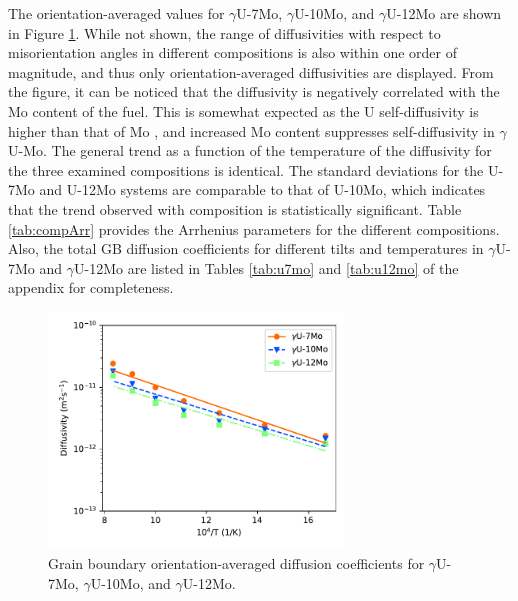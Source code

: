 \documentclass{elsarticle}
\begin{document}
The orientation-averaged values for $\gamma$U-7Mo, $\gamma$U-10Mo, and $\gamma$U-12Mo are shown in Figure \ref{fig:comp}. While not shown, the range of diffusivities with respect to misorientation angles in different compositions is also within one order of magnitude, and thus only orientation-averaged diffusivities are displayed. From the figure, it can be noticed that the diffusivity is negatively correlated with the Mo content of the fuel. This is somewhat expected as the U self-diffusivity is higher than that of Mo \cite{huang2013}, and increased Mo content suppresses self-diffusivity in $\gamma$U-Mo. The general trend as a function of the temperature of the diffusivity for the three examined compositions is identical. The standard deviations for the U-7Mo and U-12Mo systems are comparable to that of U-10Mo, which indicates that the trend observed with composition is statistically significant. Table \ref{tab:compArr} provides the Arrhenius parameters for the different compositions. Also, the total GB diffusion coefficients for different tilts and temperatures in $\gamma$U-7Mo and $\gamma$U-12Mo are listed in Tables \ref{tab:u7mo} and \ref{tab:u12mo} of the appendix for completeness.

\begin{figure}[!ht]
\centering
\includegraphics[width=0.70\textwidth]{composition_lin.pdf}
\caption{Grain boundary orientation-averaged diffusion coefficients for $\gamma$U-7Mo, $\gamma$U-10Mo, and $\gamma$U-12Mo.}
\label{fig:comp}
\end{figure}
\end{document}
